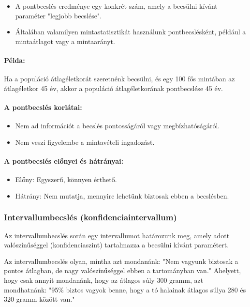 \documentclass[a4paper,12pt]{article}
\begin{document}
    \begin{itemize}
        \item A pontbecslés eredménye egy konkrét szám, amely a becsülni kívánt paraméter "legjobb becslése".
        \item Általában valamilyen mintastatisztikát használunk pontbecslésként, például a mintaátlagot vagy a mintaarányt.
    \end{itemize}

    \paragraph{Példa:}
    Ha a populáció átlagéletkorát szeretnénk becsülni, és egy 100 fős mintában az átlagéletkor 45 év, akkor a populáció átlagéletkorának pontbecslése 45 év.

    \paragraph{A pontbecslés korlátai:}
    \begin{itemize}
        \item Nem ad információt a becslés pontosságáról vagy megbízhatóságáról.
        \item Nem veszi figyelembe a mintavételi ingadozást.
    \end{itemize}

    \paragraph{A pontbecslés előnyei és hátrányai:}
    \begin{itemize}
        \item Előny: Egyszerű, könnyen érthető.
        \item Hátrány: Nem mutatja, mennyire lehetünk biztosak ebben a becslésben.
    \end{itemize}

    \subsubsection{Intervallumbecslés (konfidenciaintervallum)}

    Az intervallumbecslés során egy intervallumot határozunk meg, amely adott valószínűséggel (konfidenciaszint) tartalmazza a becsülni kívánt paramétert.

    Az intervallumbecslés olyan, mintha azt mondanánk: "Nem vagyunk biztosak a pontos átlagban, de nagy valószínűséggel ebben a tartományban van." Ahelyett, hogy csak annyit mondanánk, hogy az átlagos súly 300 gramm, azt mondhatnánk: "95\% biztos vagyok benne, hogy a tó halainak átlagos súlya 280 és 320 gramm között van."
\end{document}
